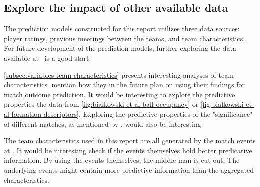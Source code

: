 \subsection{Explore the impact of other available data}

The prediction models constructed for this report utilizes three data sources: player ratings, previous meetings between the teams, and team characteristics. For future development of the prediction models, further exploring the data available at \whoscored\ is a good start.

\cref{subsec:variables-team-characteristics} presents interesting analyses of team characteristics. \citet{bib:bialkowski-lucey-carr-yue-sridharan-matthews-2014} mention how they in the future plan on using their findings for match outcome prediction. It would be interesting to explore the predictive properties the data from \cref{fig:bialkowski-et-al-ball-occupancy} or \cref{fig:bialkowski-et-al-formation-descriptors}. Exploring the predictive properties of the "significance" of different matches, as mentioned by \citet{bib:goddard-asimakopoulos-2004}, would also be interesting.

The team characteristics used in this report are all generated by the match events at \whoscored. It would be interesting check if the events themselves hold better predicative information. By using the events themselves, the middle man is cut out. The underlying events might contain more predictive information than the aggregated characteristics.